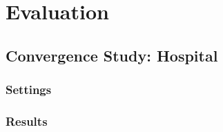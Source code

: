 \section{Evaluation}


\subsection{Convergence Study: Hospital}
\subsubsection{Settings}
\subsubsection{Results}
